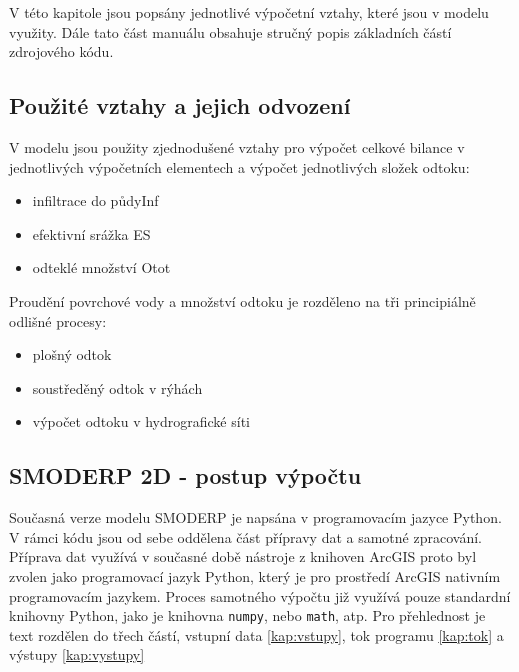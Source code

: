 %

V této kapitole jsou popsány jednotlivé výpočetní vztahy, které jsou v modelu využity. Dále tato část manuálu obsahuje stručný popis základních částí zdrojového kódu.\subsection{Použité vztahy a jejich odvození} \label{modelovani}

V modelu jsou použity zjednodušené vztahy pro výpočet celkové bilance v jednotlivých výpočetních elementech a výpočet jednotlivých složek odtoku:

\begin{itemize}
\item infiltrace do půdy\acs{Inf}
\item efektivní srážka \acs{ES}
\item odteklé množství \acs{Otot}
\end{itemize}

Proudění povrchové vody a množství odtoku je rozděleno na tři principiálně odlišné procesy:
\begin{itemize}
\item plošný odtok
\item soustředěný odtok v rýhách
\item výpočet odtoku v hydrografické síti
\end{itemize}


	


\subsection{SMODERP 2D - postup výpočtu} \label{vypocet}
Současná verze modelu SMODERP je napsána v programovacím jazyce Python. V rámci kódu jsou od sebe oddělena část přípravy dat a samotné zpracování.
Příprava dat využívá v současné době nástroje z knihoven ArcGIS proto byl zvolen jako programovací jazyk Python, který je pro prostředí ArcGIS nativním programovacím jazykem. Proces samotného výpočtu již využívá pouze standardní knihovny Python, jako je knihovna \texttt{numpy}, nebo \texttt{math}, atp. Pro přehlednost je text rozdělen do třech částí, vstupní data \ref{kap:vstupy}, tok programu \ref{kap:tok} a výstupy \ref{kap:vystupy}


